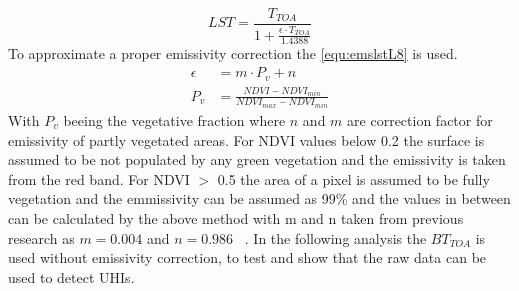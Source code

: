 \begin{equation}\label{equ:lstL8}
  LST = \frac{T_{TOA}}{1+\frac{\epsilon\cdot T_{TOA}}{1.4388}}
\end{equation}
%
To approximate a proper emissivity correction the \cref{equ:emslstL8}\cite{Sobrino2004} is used.
\begin{equation}
\begin{split}\label{equ:emslstL8}
  \epsilon &= m \cdot P_v + n \\
  P_v &= \frac{NDVI-NDVI_{min}}{NDVI_{max}- NDVI_{min}}
\end{split}
\end{equation}
With $P_v$ beeing the vegetative fraction 
where $n$ and $m$ are correction factor for emissivity of partly vegetated areas.  
%
For \ac{NDVI} values below 0.2 the surface is assumed to be not populated by any green vegetation and the emissivity is taken from the red band\cite{Nichol1994}.
For \ac{NDVI} $>$ 0.5 the area of a pixel is assumed to be fully vegetation and the emmissivity can be assumed as 99\%\cite{Sobrino2004} and the values in between can be calculated by the above method with m and n taken from previous research as $m = 0.004$ and $n = 0.986$
~\cite[equ.~12a\&b]{Sobrino2004}.
%
In the following analysis the $BT_{TOA}$ is used without emissivity correction, to test and show that the raw data can be used to detect \glspl{UHI}. 

